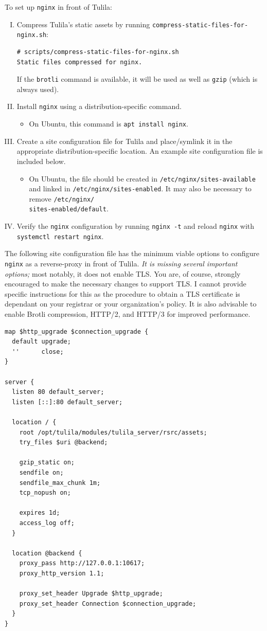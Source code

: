 \documentclass[12pt]{article}
\begin{document}
To set up \texttt{nginx} in front of Tulila:
\begin{enumerate}[I.]
  \item Compress Tulila's static assets by running \texttt{compress-static-files-for-nginx.sh}:
  \begin{Verbatim}
# scripts/compress-static-files-for-nginx.sh
Static files compressed for nginx.
  \end{Verbatim}
  If the \texttt{brotli} command is available, it will be used as well as \texttt{gzip} (which is always used).
  \item Install \texttt{nginx} using a distribution-specific command.
  \begin{itemize}[$\circ$]
    \item On Ubuntu, this command is \texttt{apt install nginx}.
  \end{itemize}
  \item Create a site configuration file for Tulila and place/symlink it in the appropriate distribution-specific location. An example site configuration file is included below.
  \begin{itemize}[$\circ$]
    \item On Ubuntu, the file should be created in \texttt{/etc/nginx/sites-available} and linked in \texttt{/etc/nginx/sites-enabled}. It may also be necessary to remove \texttt{/etc/nginx/\\sites-enabled/default}.
  \end{itemize}
  \item Verify the \texttt{nginx} configuration by running \texttt{nginx -t} and reload \texttt{nginx} with \texttt{systemctl restart nginx}.
\end{enumerate}

The following site configuration file has the minimum viable options to configure \texttt{nginx} as a reverse-proxy in front of Tulila. \textit{It is missing several important options;} most notably, it does not enable TLS. You are, of course, strongly encouraged to make the necessary changes to support TLS. I cannot provide specific instructions for this as the procedure to obtain a TLS certificate is dependant on your registrar or your organization's policy. It is also advisable to enable Brotli compression, HTTP/2, and HTTP/3 for improved performance.

\begin{Verbatim}
map $http_upgrade $connection_upgrade {
  default upgrade;
  ''      close;
}

server {
  listen 80 default_server;
  listen [::]:80 default_server;

  location / {
    root /opt/tulila/modules/tulila_server/rsrc/assets;
    try_files $uri @backend;

    gzip_static on; 
    sendfile on;
    sendfile_max_chunk 1m;
    tcp_nopush on;

    expires 1d;
    access_log off;
  }

  location @backend {
    proxy_pass http://127.0.0.1:10617;
    proxy_http_version 1.1;

    proxy_set_header Upgrade $http_upgrade;
    proxy_set_header Connection $connection_upgrade;
  }
}
\end{Verbatim}
\end{document}
